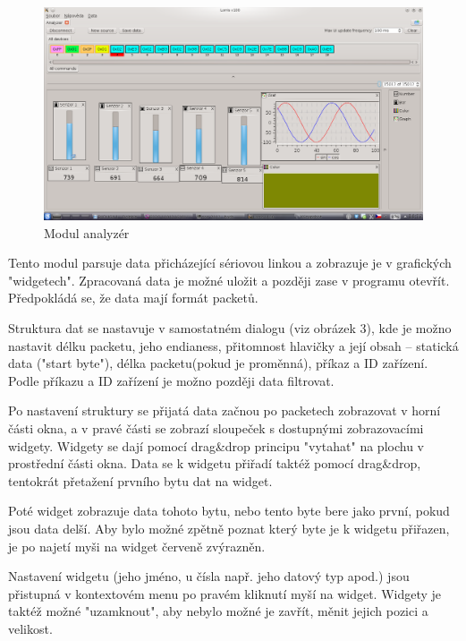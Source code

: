 \documentclass[12pt, a4paper, oneside]{article}
\begin{document}
\begin{figure}[h]
\begin{center}
\includegraphics[width=\textwidth]{img/analyzer_all.png}
\caption{Modul analyzér}
\label{Analyzer}
\end{center}
\end{figure}

Tento modul parsuje data přicházející sériovou linkou a zobrazuje je v grafických "widgetech". Zpracovaná data je možné uložit a později zase v programu otevřít. Předpokládá se, že data mají formát packetů.

Struktura dat se nastavuje v samostatném dialogu (viz obrázek 3), kde je možno nastavit délku packetu, jeho endianess\cite{endian}, přitomnost hlavičky a její obsah -- statická data ("start byte"), délka packetu(pokud je proměnná), příkaz a ID zařízení. Podle příkazu a ID zařízení je možno později data filtrovat.

Po nastavení struktury se přijatá data začnou po packetech zobrazovat v horní části okna, a v pravé části se zobrazí sloupeček s dostupnými zobrazovacími widgety. Widgety se dají pomocí drag\&drop principu "vytahat" na plochu v prostřední části okna. Data se k widgetu přiřadí taktéž pomocí drag\&drop, tentokrát přetažení prvního bytu dat na widget. 

\newpage
\setlength{\voffset}{0mm} %
\pagestyle{plain}

Poté widget zobrazuje data tohoto bytu, nebo tento byte bere jako první, pokud jsou data delší. Aby bylo možné zpětně poznat který byte je k widgetu přiřazen, je po najetí myši na widget červeně zvýrazněn.

Nastavení widgetu (jeho jméno, u čísla např. jeho datový typ apod.) jsou přistupná v kontextovém menu po pravém kliknutí myší na widget. Widgety je taktéž možné "uzamknout", aby nebylo možné je zavřít, měnit jejich pozici a velikost.
\end{document}
